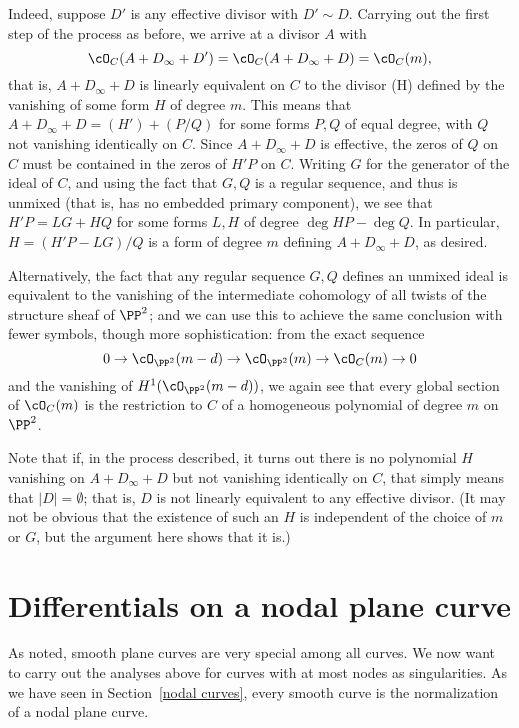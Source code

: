 Indeed, suppose $D'$ is any effective divisor with $D' \sim D$. Carrying out the first step of the process as before, we arrive at a divisor $A$ with 
$$
\cO_C(A+D_\infty+D') = \cO_C(A+D_\infty+D)  = \cO_C(m),
$$
that is, $A+D_\infty+D$ is linearly equivalent on $C$ to the divisor (H) defined by the vanishing of some form $H$ of degree $m$. This means that
$A+D_\infty+D  = (H') +(P/Q)$ for some forms $P,Q$ of equal degree, with $Q$ not vanishing identically on $C$. Since $A+D_\infty+D$ is effective,
the zeros of $Q$ on $C$ must be contained in the zeros of $H'P$ on $C$. Writing
$G$ for the generator of the ideal of $C$, and using the fact that
$G,Q$ is a regular sequence, and thus is unmixed (that is, has no embedded primary component), we see that $H'P = LG+HQ$ for some
forms $L,H$ of degree $\deg HP - \deg Q$. In particular, $H = (H'P- LG)/Q$ is a form
of degree $m$ defining $A+D_\infty+D$, as desired.

Alternatively, the fact that any regular sequence $G,Q$ defines an unmixed ideal is equivalent to the vanishing of the intermediate cohomology of all twists of the structure sheaf of $\PP^2$; and we can use this to achieve the same conclusion with fewer symbols, though more sophistication: from the exact sequence 
$$
0 \to \cO_{\PP^2}(m-d) \to \cO_{\PP^2}(m)  \to \cO_C(m) \to 0
$$
and the vanishing of $H^1(\cO_{\PP^2}(m-d))$, we again see that every global section of $ \cO_C(m)$ is the restriction to $C$ of a homogeneous polynomial of degree $m$ on $\PP^2$. 

Note that if, in the process described, it turns out there is no polynomial $H$ vanishing on  $A + D_\infty + D$ but not vanishing identically on $C$, that simply means that $|D| = \emptyset$; that is, $D$ is not linearly equivalent to any effective divisor. (It may not be obvious that the existence of such an $H$ is independent of the choice of $m$ or $G$, but the argument here shows that it is.)



\section{Differentials on a nodal plane curve}\label{canonical series on nodal plane curves}

As noted, smooth plane curves are very special among all curves. We now want to carry out the analyses above for curves with at most nodes as singularities. As we have seen in Section~\ref{nodal curves}, every smooth curve is the normalization of a nodal plane curve.


